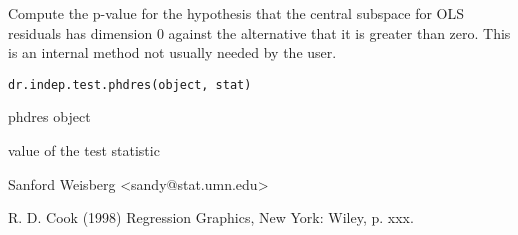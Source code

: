 \begin{Description}\relax
Compute the p-value for the hypothesis that the central
subspace for OLS residuals has dimension 0 against the alternative that it
is greater than zero.  This is an
internal method not usually needed by the user.\end{Description}
\begin{Usage}
\begin{verbatim}
dr.indep.test.phdres(object, stat)
\end{verbatim}
\end{Usage}
\begin{Arguments}
\begin{ldescription}
\item[\code{object}] phdres object 
\item[\code{stat}] value of the test statistic 
\end{ldescription}
\end{Arguments}
\begin{Author}\relax
Sanford Weisberg <sandy@stat.umn.edu>\end{Author}
\begin{References}\relax
R. D. Cook (1998) Regression Graphics, New York:  Wiley, p. xxx.\end{References}
\begin{SeeAlso}\relax
{}\end{SeeAlso}
\begin{Examples}
\end{Examples}

